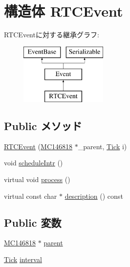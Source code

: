 \hypertarget{structMC146818_1_1RTCEvent}{
\section{構造体 RTCEvent}
\label{structMC146818_1_1RTCEvent}
}
RTCEventに対する継承グラフ:\begin{figure}[H]
\begin{center}
\leavevmode
\includegraphics[height=3cm]{structMC146818_1_1RTCEvent}
\end{center}
\end{figure}
\subsection*{Public メソッド}
\begin{DoxyCompactItemize}
\item 
\hyperlink{structMC146818_1_1RTCEvent_ad20105f1a208e8590da95c6f556f6b6f}{RTCEvent} (\hyperlink{classMC146818}{MC146818} $\ast$\_\-parent, \hyperlink{base_2types_8hh_a5c8ed81b7d238c9083e1037ba6d61643}{Tick} i)
\item 
void \hyperlink{structMC146818_1_1RTCEvent_a5300e17e5d721149683cb2bac69c7571}{scheduleIntr} ()
\item 
virtual void \hyperlink{structMC146818_1_1RTCEvent_a2e9c5136d19b1a95fc427e0852deab5c}{process} ()
\item 
virtual const char $\ast$ \hyperlink{structMC146818_1_1RTCEvent_a5a14fe478e2393ff51f02e9b7be27e00}{description} () const 
\end{DoxyCompactItemize}
\subsection*{Public 変数}
\begin{DoxyCompactItemize}
\item 
\hyperlink{classMC146818}{MC146818} $\ast$ \hyperlink{structMC146818_1_1RTCEvent_a2013f7dfc8d6920600d61ad1f696a537}{parent}
\item 
\hyperlink{base_2types_8hh_a5c8ed81b7d238c9083e1037ba6d61643}{Tick} \hyperlink{structMC146818_1_1RTCEvent_a75c022086cc1012d51fcf693b9539b8f}{interval}
\end{DoxyCompactItemize}


